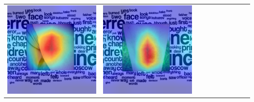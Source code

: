 \begin{landscape}
\begin{table}[]
\begin{tabular}{@{}c c c c c c c c c c@{}}
			\includegraphics[width=.12\textheight ,keepaspectratio]{images/pretraining/gradcam/3/MobileNetV3SmallCombinedGradCam.png} &
			\includegraphics[width=.12\textheight ,keepaspectratio]{images/pretraining/gradcam/9/MobileNetV3SmallCombinedGradCam.png}
			\\\cmidrule(lr){1-10}
			

\end{tabular}
\end{table}
\end{landscape}
